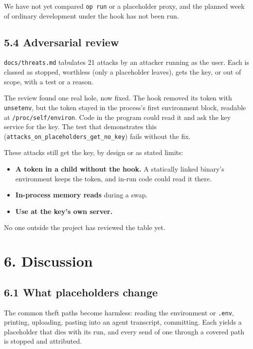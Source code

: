 \documentclass[
  11pt]{article}
\providecommand{\tightlist}{%
  \setlength{\itemsep}{0pt}\setlength{\parskip}{0pt}}
\begin{document}
We have not yet compared
\texttt{op\ run} or a placeholder proxy,
and the planned week of ordinary
development under the hook has not been
run.

\subsection*{5.4 Adversarial
review}\label{adversarial-review}

\texttt{docs/threats.md} tabulates 21
attacks by an attacker running as the
user. Each is classed as stopped,
worthless (only a placeholder leaves),
gets the key, or out of scope, with a
test or a reason.

The review found one real hole, now
fixed. The hook removed its token with
\texttt{unsetenv}, but the token stayed
in the process's first environment
block, readable at
\texttt{/proc/self/environ}. Code in the
program could read it and ask the key
service for the key. The test that
demonstrates this
(\texttt{attacks\_on\_placeholders\_get\_no\_key})
fails without the fix.

These attacks still get the key, by
design or as stated limits:

\begin{itemize}
\tightlist
\item
  \textbf{A token in a child without the
  hook.} A statically linked binary's
  environment keeps the token, and
  in-run code could read it there.
\item
  \textbf{In-process memory reads}
  during a swap.
\item
  \textbf{Use at the key's own server.}
\end{itemize}

No one outside the project has reviewed
the table yet.

\section*{6.
Discussion}\label{discussion}

\subsection*{6.1 What placeholders
change}\label{what-placeholders-change}

The common theft paths become harmless:
reading the environment or
\texttt{.env}, printing, uploading,
pasting into an agent transcript,
committing. Each yields a placeholder
that dies with its run, and every send
of one through a covered path is stopped
and attributed.
\end{document}
